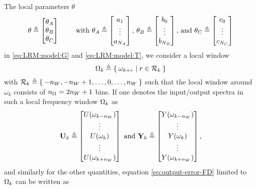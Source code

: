 The local parameters $\theta$  
\begin{equation}
\theta \isdef 
\begin{bmatrix}
\theta_A\\ 
\theta_B\\
\theta_C
\end{bmatrix}
\qquad \text{ with }
\theta_A \isdef
\begin{bmatrix}
a_1\\ \vdots\\ a_{\order{A}}
\end{bmatrix}
\text{, }
\theta_B \isdef
\begin{bmatrix}
b_0\\ \vdots\\ b_{\order{B}}
\end{bmatrix}
\text{, and }
\theta_C \isdef
\begin{bmatrix}
c_0\\ \vdots\\ c_{\order{C}}
\end{bmatrix}
\end{equation}
in \eqref{eq:LRM:model:G} and \eqref{eq:LRM:model:T}, we consider a local window
\begin{equation}
  \LocalWindow[k] 
  \isdef
  \Set{
    \omega_{k+r} 
    | 
    r \in \LocalShifts{k}
  }
\end{equation}
with $\LocalShifts{k} \isdef \Set{-\numel{W}, -\numel{W}+1, \ldots, 0, \ldots, \numel{W}}$
such that the local window around $\omega_k$ consists of $\numel{\LocalWindow} = 2 \numel{W} + 1$ bins. 
If one denotes the input/output spectra in such a local frequency window $\LocalWindow[k]$ as
\begin{equation}
  \LocalVector{U}_k \isdef 
  \mat{
    U(\omega_{k-\numel{W}})\\
    \vdots\\
    U(\omega_{k})\\
    \vdots\\
    U(\omega_{k+\numel{W}})\\
  }
  \text{ and }
  \LocalVector{Y}_k \isdef 
  \mat{
    Y(\omega_{k-\numel{W}})\\
    \vdots\\
    Y(\omega_{k})\\
    \vdots\\
    Y(\omega_{k+\numel{W}})\\
  }
  \text{,}
\end{equation}
and similarly for the other quantities, equation \eqref{eq:output-error-FD} limited to $\LocalWindow[k]$ can be written as
